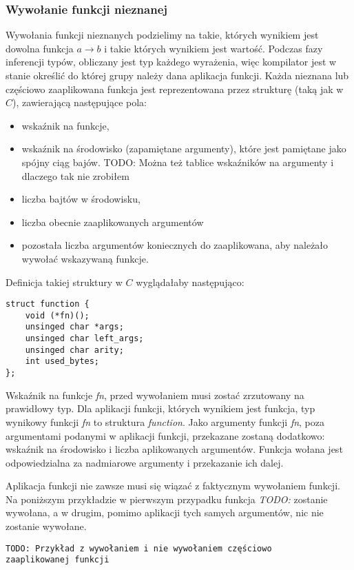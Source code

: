 \documentclass[declaration,shortabstract]{iithesis}
\begin{document}
\subsubsection{Wywołanie funkcji nieznanej}

Wywołania funkcji nieznanych podzielimy na takie, których wynikiem jest dowolna
funkcja $ a \rightarrow b $ i takie których wynikiem jest wartość. Podczas
fazy inferencji typów, obliczany jest typ każdego wyrażenia, więc kompilator
jest w stanie określić do której grupy należy dana aplikacja funkcji. Każda 
nieznana lub częściowo zaaplikowana funkcja jest reprezentowana przez strukturę 
(taką jak w $C$), 
zawierającą następujące pola:

\begin{itemize}
  \item wskaźnik na funkcje,
  \item wskaźnik na środowisko (zapamiętane argumenty), które jest pamiętane 
  jako spójny ciąg bajów. TODO: Można też tablice wskaźników na argumenty i 
  dlaczego tak nie zrobiłem
  \item liczba bajtów w środowisku,
  \item liczba obecnie zaaplikowanych argumentów
  \item pozostała liczba argumentów koniecznych do zaaplikowana, aby należało 
  wywołać wskazywaną funkcje.
\end{itemize}

Definicja takiej struktury w $C$ wyglądałaby następująco:

\begin{lstlisting}[frame=single, caption=Rozwinięta funkcja w OCamlu.]
struct function {
    void (*fn)();
    unsinged char *args;
    unsinged char left_args;
    unsinged char arity;
    int used_bytes;   
};
\end{lstlisting}

Wskaźnik na funkcje \textit{fn}, przed wywołaniem musi zostać zrzutowany na 
prawidłowy typ. Dla aplikacji funkcji, których wynikiem jest funkcja, typ 
wynikowy funkcji \textit{fn} to struktura \textit{function}. Jako argumenty 
funkcji \textit{fn}, poza argumentami podanymi w aplikacji funkcji, przekazane 
zostaną dodatkowo: wskaźnik na środowisko i liczba aplikowanych argumentów.
Funkcja wołana jest odpowiedzialna za nadmiarowe argumenty i przekazanie ich 
dalej.

Aplikacja funkcji nie zawsze musi się wiązać z faktycznym wywołaniem funkcji.
Na poniższym przykładzie w pierwszym przypadku funkcja \textit{TODO:}
zostanie wywołana, a w drugim, pomimo aplikacji tych samych argumentów, nic nie 
zostanie wywołane.
\begin{lstlisting}[frame=single, caption={To czy funkcja zostanie wywołana,
nie jest wiadome w czasie kompilacj.}]
TODO: Przykład z wywołaniem i nie wywołaniem częściowo 
zaaplikowanej funkcji  
\end{lstlisting}
\end{document}
